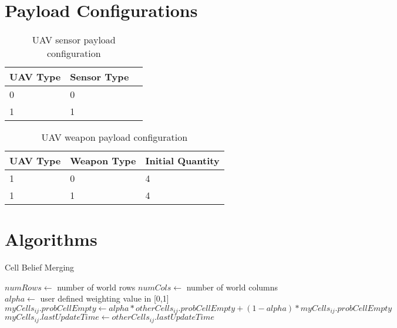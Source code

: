 
\fontsize{10pt}{1pt}

\chapter{Payload Configurations}
\label{sec:pyldConfigs}
\begin{table}[H]
	\caption{UAV sensor payload configuration}
	\centering
	\label{tab:uavSensorMap}
	\begin{tabular}{|p{1cm}|p{1cm}|p{1cm}|}
		\hline
		UAV Type & Sensor Type\\ \hline
		0 & 0 \\
		1 & 1 \\
		\hline
	\end{tabular}
\end{table}

\begin{table}[H]
	\caption{UAV weapon payload configuration}
	\centering
	\label{tab:uavWpnMap}
	\begin{tabular}{|p{1cm}|p{1.5cm}|p{2cm}|}
		\hline
		UAV Type & Weapon Type & Initial Quantity\\ \hline
		1 & 0 & 4 \\
		1 & 1 & 4 \\
		\hline
	\end{tabular}
\end{table}


\chapter{Algorithms}
\label{sec:algorithms}



\begin{algorithm}[H]
	\caption{Cell Belief Merging}
	\label{alg:mergeCell}
	\begin{algorithmic}[1]
		\State $numRows\gets $ number of world rows
		\State $numCols\gets $ number of world columns
		\State $alpha\gets $ user defined weighting value in [0,1]
					\State $myCells_{ij}.probCellEmpty\gets alpha * otherCells_{ij}.probCellEmpty + (1-alpha) * myCells_{ij}.probCellEmpty$
					\State $myCells_{ij}.lastUpdateTime\gets otherCells_{ij}.lastUpdateTime$
				\EndIf
			\EndFor
		\EndFor
		\EndFunction
	\end{algorithmic}
\end{algorithm}

